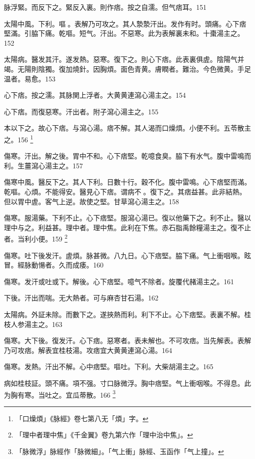 脉浮緊。而反下之。緊反入裏。則作痞。按之自濡。但气痞耳。151

太陽中風。下利。嘔{\sungtpii 𠱘}。表解乃可攻之。其人漐漐汗出。发作有时。頭痛。心下痞堅滿。引脇下痛。乾嘔。短气。汗出。不惡寒。此为表解裏未和。十棗湯主之。152

太陽病。醫发其汗。遂发熱。惡寒。復下之。則心下痞。此表裏俱虗。陰陽气并竭。无陽則陰獨。復加燒針。因胸煩。面色青黄。膚瞤者。難治。今色微黄。手足温者。易愈。153

心下痞。按之濡。其脉関上浮者。大黄{\khaaitp 黄連}瀉心湯主之。154

心下痞。而復惡寒。汗出者。附子瀉心湯主之。155

本以下之。故心下痞。与瀉心湯。痞不解。其人渴而口燥{\khaaitp 煩}。小便不利。五苓散主之。156
	\footnote{
		「口燥煩」《脉經》卷七第八无「煩」字。
	}

傷寒。汗出。解之後。胃中不和。心下痞堅。乾噫食臭。脇下有水气。腹中雷鳴而利。生薑瀉心湯主之。157

傷寒中風。醫反下之。其人下利。日數十行。穀不化。腹中雷鳴。心下痞堅而滿。乾嘔。心煩。不{\khaaitp 能}得安。醫見心下痞。谓病不{\sungtpii 𥁞}。復下之。其痞益甚。此非結熱。但以胃中虗。客气上逆。故使之堅。甘草瀉心湯主之。158

傷寒。服湯藥。下利不止。心下痞堅。服瀉心湯已。復以他藥下之。利不止。醫以理中与之。利益甚。理中者。理中焦。此利在下焦。赤石脂禹餘糧湯主之。復不止者。当利小便。159
	\footnote{
		「理中者理中焦」《千金翼》卷九第六作「理中治中焦」。
	}

傷寒。吐下{\khaaitp 後}发汗。虗煩。脉甚微。八九日。心下痞堅。脇下痛。气上衝咽喉。眩冒。經脉動愓者。久而成痿。160

傷寒。发汗{\khaaitp 或}吐{\khaaitp 或}下。解後。心下痞堅。噫气不除者。旋覆代赭湯主之。161

下後。汗出而喘。无大熱者。可与麻杏甘石湯。162

太陽病。外証未除。而數下之。遂挾熱而利。利下不止。心下痞堅。表裏不解。桂枝人参湯主之。163

傷寒。大下後。復发汗。心下痞。惡寒者。表未解也。不可攻痞。当先解表。表解乃可攻痞。解表宜桂枝湯。攻痞宜大黄黄連瀉心湯。164

傷寒。发熱。汗出不解。心中痞堅。嘔吐。下利。大柴胡湯主之。165

病如桂枝証。頭不痛。項不强。寸{\khaaitp 口}脉微浮。胸中痞堅。气上衝咽喉。不得息。此为胸有寒。当吐之。宜瓜蒂散。166
	\footnote{「脉微浮」脉經作「脉微細」。「气上衝」脉經、玉函作「气上撞」。}

